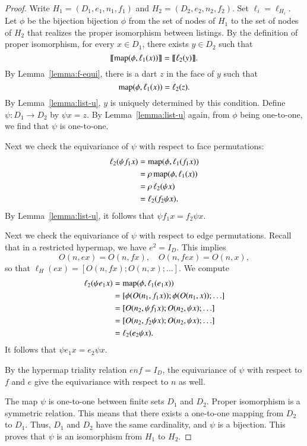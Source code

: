 \begin{proof} 
  Write $H_1 =(D_1,e_1,n_1,f_1)$ and $H_2=(D_2,e_2,n_2,f_2)$.  Set
  $\ell_i = \ell_{H_i}$.  Let $\phi$ be the bijection bijection $\phi$
  from the set of nodes of $H_1$ to the set of nodes of $H_2$ that
  realizes the proper isomorphism between listings.  By the definition
  of proper isomorphism, for every $x\in D_1$, there exists $y\in D_2$
  such that
\[
{\llbracket{{\operatorname{map}}(\phi,\ell_{1}(x))}\rrbracket} = {\llbracket{\ell_{2}(y)}\rrbracket}.
\]
By Lemma~\ref{lemma:f-equi}, there is a dart $z$ in the face of $y$ such that
\[
{\operatorname{map}}(\phi,\ell_{1}(x)) = \ell_{2}(z).
\]
By Lemma~\ref{lemma:list-u}, $y$ is uniquely determined by this
condition.  Define $\psi:D_1\to D_2$ by $\psi x = z$.  By
Lemma~\ref{lemma:list-u} again, from $\phi$ being one-to-one, we find
that $\psi$ is one-to-one.

Next we check the equivariance of $\psi$ with respect to face permutations:
\begin{align*}
\ell_{2}(\psi f_1 x) &= {\operatorname{map}}(\phi,\ell_{1}(f_1 x)) \\
   &= \rho\, {\operatorname{map}}(\phi,\ell_{1} (x)) \\
   &= \rho\, \ell_{2}(\psi x)\\
   &= \ell_2(f_2 \psi x).
\end{align*}
By Lemma~\ref{lemma:list-u}, it follows that $\psi f_1 x = f_2 \psi x$.

Next we check the equivariance of $\psi$ with respect to edge
permutations.  Recall that in a restricted hypermap, we have
$e^2=I_D$.  This implies
\[
O(n,e x) =  O(n,f x),\quad
O(n,f e x) = O(n,x),
\]
so that $\ell_H(e x) = [O(n,f x);O(n,x);\ldots]$.  We compute
\begin{align*}
\ell_2(\psi e_1 x) &= {\operatorname{map}}(\phi,\ell_1(e_1 x)) \\
  &= [\phi(O(n_1,f_1 x));\phi(O(n_1,x));\ldots]\\
  &= [O(n_2,\psi f_1 x);O(n_2,\psi x);\ldots]\\
  &= [O(n_2,f_2\psi x);O(n_2,\psi x);\ldots]\\
   &=\ell_2(e_2 \psi x).
\end{align*}
It follows that $\psi e_1 x = e_2 \psi x$.

By the hypermap triality relation $e n f = I_D$, the equivariance of
$\psi$ with respect to $f$ and $e$ give the equivariance with respect
to $n$ as well.

The map $\psi$ is one-to-one between finite sets $D_1$ and $D_2$.
Proper isomorphism is a symmetric relation.  This means that there
exists a one-to-one mapping from $D_2$ to $D_1$.  Thus, $D_1$ and
$D_2$ have the same cardinality, and $\psi$ is a bijection.  This
proves that $\psi$ is an isomorphism from $H_1$ to $H_2$.
\end{proof}


